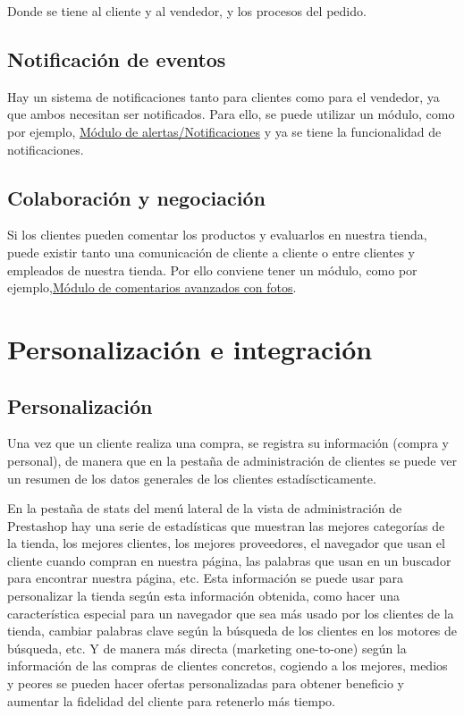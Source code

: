\documentclass{article}
\begin{document}
Donde se tiene al cliente y al vendedor, y los procesos del pedido.

\subsection{Notificación de eventos}

Hay un sistema de notificaciones tanto para clientes como para el vendedor, ya que ambos necesitan ser notificados. Para ello, se puede utilizar un módulo, como por ejemplo, \href{https://addons.prestashop.com/es/emails-notificaciones/22787-alertas-notificaciones-sms-email-y-voz-afilnet.html}{Módulo de alertas/Notificaciones} y ya se tiene la funcionalidad de notificaciones.

\subsection{Colaboración y negociación}

Si los clientes pueden comentar los productos y evaluarlos en nuestra tienda, puede existir tanto una comunicación de cliente a cliente o entre clientes y empleados de nuestra tienda. Por ello conviene tener un módulo, como por ejemplo,\href{https://addons.prestashop.com/es/comentarios-clientes/22373-comentarios-avanzados-con-fotos-google-rich-snippets.html}{Módulo de comentarios avanzados con fotos}.

\section{Personalización e integración}

\subsection{Personalización}

Una vez que un cliente realiza una compra, se registra su información (compra y personal), de manera que en la pestaña de administración de clientes se puede ver un resumen de los datos generales de los clientes estadíscticamente.

En la pestaña de stats del menú lateral de la vista de administración de Prestashop hay una serie de estadísticas que muestran las mejores categorías de la tienda, los mejores clientes, los mejores proveedores, el navegador que usan el cliente cuando compran en nuestra página, las palabras que usan en un buscador para encontrar nuestra página, etc. Esta información se puede usar para personalizar la tienda según esta información obtenida, como hacer una característica especial para un navegador que sea más usado por los clientes de la tienda, cambiar palabras clave según la búsqueda de los clientes en los motores de búsqueda, etc. Y de manera más directa (marketing one-to-one) según la información de las compras de clientes concretos, cogiendo a los mejores, medios y peores se pueden hacer ofertas personalizadas para obtener beneficio y aumentar la fidelidad del cliente para retenerlo más tiempo.
\end{document}
